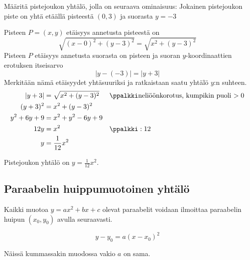 \begin{esimerkki}
Määritä pistejoukon yhtälö, jolla on seuraava ominaisuus: Jokainen pistejoukon piste on yhtä etäällä pisteestä $(0, 3)$ ja suorasta $y=-3$
\begin{esimratk}
Pisteen $P=(x, y)$ etäisyys annetusta pisteestä on
\[
\sqrt{(x-0)^2+(y-3)^2}=\sqrt{x^2+(y-3)^2}
\]
Pisteen $P$ etäisyys annetusta suorasta on pisteen ja suoran $y$-koordinaattien erotuksen itseisarvo
\[
|y-(-3)| = |y+3| 
\]
Merkitään nämä etäisyydet yhtäsuuriksi ja ratkaistaan saatu yhtälö $y$:n suhteen.
\begin{align*}
|y+3| & = \sqrt{x^2+(y-3)^2} &&\ppalkki \text{neliöönkorotus, kumpikin puoli $>0$}\\
(y+3)^2  &= x^2+(y-3)^2 \\
y^2+6y+9 &=  x^2+y^2-6y+9\\
12y &= x^2 &&\ppalkki : 12\\
y &= \frac{1}{12}x^2
\end{align*}

Pistejoukon yhtälö on $y=\frac{1}{12}x^2$.

\end{esimratk}
\end{esimerkki}

\subsection{Paraabelin huippumuotoinen yhtälö}

Kaikki muotoa $y=ax^2+bx+c$ olevat paraabelit voidaan ilmoittaa paraabelin huipun $(x_0, y_0)$ avulla seuraavasti.

\[
y-y_0 = a(x-x_0)^2
\]

Näissä kummassakin muodossa vakio $a$ on sama.


